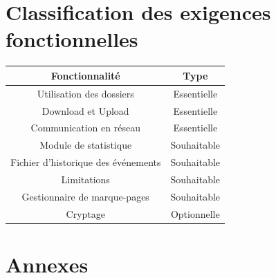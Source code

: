 \documentclass[10pt,a4paper]{report}
\begin{document}
\section{Classification des exigences fonctionnelles}
\bgroup
\def\arraystretch{1.5}
\begin{tabular}{|c|c|}
	\hline
	{\large \textbf{Fonctionnalité}} & {\large \textbf{Type}}\\
	\hline
	Utilisation des dossiers & Essentielle\\
	\hline
	Download et Upload & Essentielle \\
	\hline
	Communication en réseau & Essentielle \\
	\hline
	Module de statistique & Souhaitable \\
	\hline
	Fichier d'historique des événements & Souhaitable \\
	\hline
	Limitations & Souhaitable\\
	\hline
	Gestionnaire de marque-pages & Souhaitable\\
	\hline
	Cryptage & Optionnelle\\
	\hline
\end{tabular}
\egroup


\section{Annexes}
\end{document}
